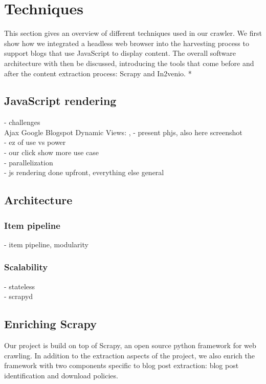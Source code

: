 \section{Techniques}

This section gives an overview of different techniques used in our crawler. We first show how we integrated a headless web browser into the harvesting process to support blogs that use JavaScript to display content. The overall software architecture with then be discussed, introducing the tools that come before and after the content extraction process: Scrapy and In2venio. *

\subsection{JavaScript rendering}
- challenges \\
Ajax
Google Blogspot Dynamic Views: , 
- present phjs, also here screenshot \\
- ez of use vs power \\
- our click show more use case \\
- parallelization \\
- js rendering done upfront, everything else general \\

\subsection{Architecture}
\subsubsection{Item pipeline}
- item pipeline, modularity \\

\subsubsection{Scalability}
- stateless \\
- scrapyd \\


\subsection{Enriching Scrapy}
Our project is build on top of Scrapy, an open source python framework for web crawling. In addition to the extraction aspects of the project, we also enrich the framework with two components specific to blog post extraction: blog post identification and download policies.

